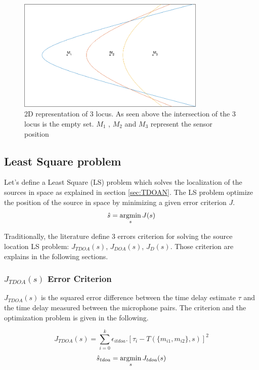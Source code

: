 \begin{figure}[H]
    \centering
    \includegraphics[width=0.8\textwidth]{Figures/intersect.png}
    \caption{2D representation of 3 locus. As seen above the intersection of the 3 locus is the empty set. $M_{1}$ , $M_{2}$ and $M_{3}$ represent the sensor position}
    \label{fig:hyperboloid_intersect}
\end{figure}

\subsection{Least Square problem}\label{sec:LSTDOA}

Let's define a Least Square (LS) problem which solves the localization of the sources in space as explained in section \ref{sec:TDOAN}. The LS problem optimize the position of the source in space by minimizing a given error criterion $ J $.
\begin{equation}
\hat{s}= \argmin_{s} J(s) 
\end{equation}

Traditionally, the literature define 3 errors criterion for solving the source location LS problem:  $J_{TDOA}(s)$, $J_{DOA}(s)$, $J_{D}(s)$. Those criterion are explains in the following sections.

\subsubsection{$J_{TDOA}(s)$ Error Criterion}

$J_{TDOA}(s)$ is the squared error difference between the time delay estimate $\tau$ and the time delay measured between the microphone pairs. The criterion and the optimization problem is given in the following.

\begin{equation}
J_{TDOA}(s) = {\sum}_{i=0}^k \epsilon_{itdoa}.[\tau_{i}-T(\{m_{i1},m_{i2}\},s)]^2
\label{eq:jtdoa}
\end{equation}
\begin{equation}
\hat{s}_{tdoa}= \argmin_{s} J_{tdoa}(s) 
\end{equation}

